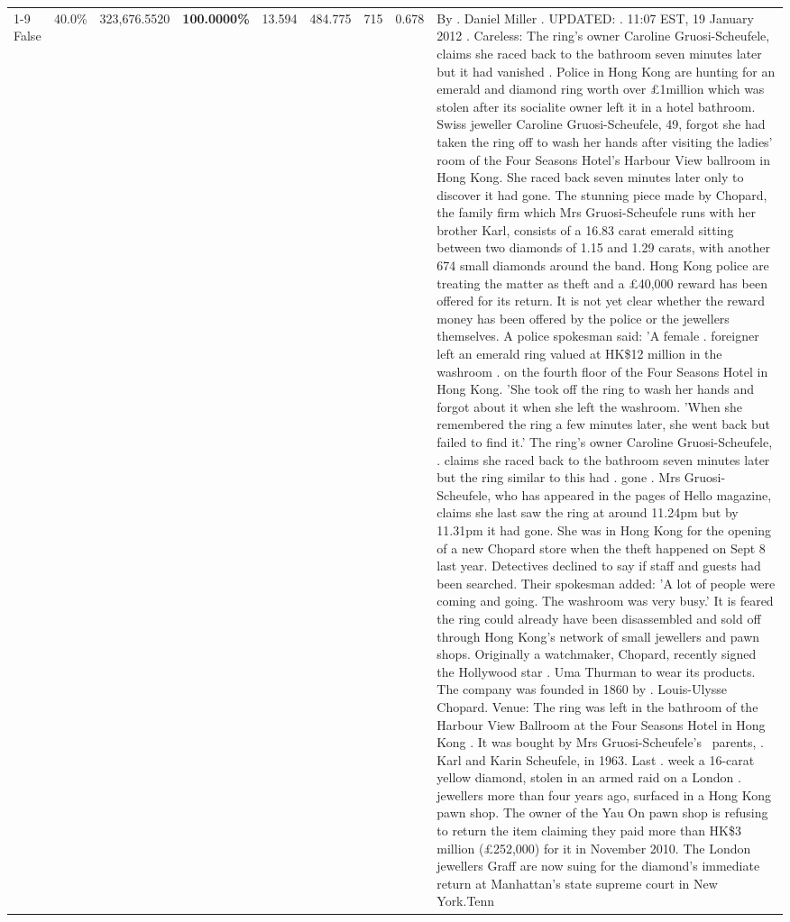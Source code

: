 \begin{table}[H]
\begin{tabular}{lllrlllll}
\cline{1-9}
False & 40.0\% & 323,676.5520 & \bfseries \color{red} 100.0000\% & 13.594 & 484.775 & 715 & 0.678 & By . Daniel Miller . UPDATED: . 11:07 EST, 19 January 2012 . Careless: The ring's owner Caroline Gruosi-Scheufele, claims she raced back to the bathroom seven minutes later but it had vanished . Police in Hong Kong are hunting for an emerald and diamond ring worth over £1million which was stolen after its socialite owner left it in a hotel bathroom. Swiss jeweller Caroline Gruosi-Scheufele, 49, forgot she had taken the ring off to wash her hands after visiting the ladies' room of the Four Seasons Hotel's Harbour View ballroom in Hong Kong. She raced back seven minutes later only to discover it had gone. The stunning piece made by Chopard, the family firm which Mrs Gruosi-Scheufele runs with her brother Karl, consists of a 16.83 carat emerald sitting between two diamonds of 1.15 and 1.29 carats, with another 674 small diamonds around the band. Hong Kong police are treating the matter as theft and a £40,000 reward has been offered for its return. It is not yet clear whether the reward money has been offered by the police or the jewellers themselves. A police spokesman said: 'A female . foreigner left an emerald ring valued at HK\$12 million in the washroom . on the fourth floor of the Four Seasons Hotel in Hong Kong. 'She took off the ring to wash her hands and forgot about it when she left the washroom. 'When she remembered the ring a few minutes later, she went back but failed to find it.' The ring's owner Caroline Gruosi-Scheufele, . claims she raced back to the bathroom seven minutes later but the ring similar to this had . gone . Mrs Gruosi-Scheufele, who has appeared in the pages of Hello magazine, claims she last saw the ring at around 11.24pm but by 11.31pm it had gone. She was in Hong Kong for the opening of a new Chopard store when the theft happened on Sept 8 last year. Detectives declined to say if staff and guests had been searched. Their spokesman added: 'A lot of people were coming and going. The washroom was very busy.' It is feared the ring could already have been disassembled and sold off through Hong Kong's network of small jewellers and pawn shops. Originally a watchmaker, Chopard, recently signed the Hollywood star . Uma Thurman to wear its products. The company was founded in 1860 by . Louis-Ulysse Chopard. Venue: The ring was left in the bathroom of the Harbour View Ballroom at the Four Seasons Hotel in Hong Kong . It was bought by Mrs Gruosi-Scheufele's  parents, . Karl and Karin Scheufele, in 1963. Last . week a 16-carat yellow diamond, stolen in an armed raid on a London . jewellers more than four years ago, surfaced in a Hong Kong pawn shop. The owner of the Yau On pawn shop is refusing to return the item claiming they paid more than HK\$3 million (£252,000) for it in November 2010. The London jewellers Graff are now suing for the diamond’s immediate return at Manhattan’s state supreme court in New York.Tenn \\

\end{tabular}
\end{table}
